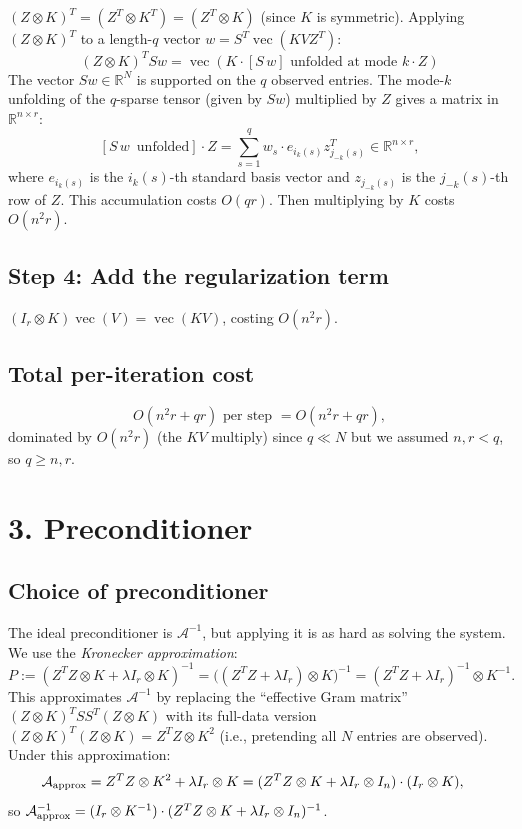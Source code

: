 \documentclass[12pt]{article}
\newcommand{\bR}{\mathbb{R}}
\DeclareMathOperator{\vecop}{vec}
\newcommand{\bR}{\mathbb{R}}
\begin{document}
$(Z\otimes K)^T = (Z^T\otimes K^T) = (Z^T\otimes K)$ (since $K$ is symmetric).  Applying $(Z\otimes K)^T$ to a length-$q$ vector $w = S^T\vecop(KVZ^T)$:
\[
  (Z\otimes K)^T S w = \vecop(K \cdot [S\,w]\text{ unfolded at mode }k \cdot Z)
\]
The vector $Sw \in\bR^N$ is supported on the $q$ observed entries.  The mode-$k$ unfolding of the $q$-sparse tensor (given by $Sw$) multiplied by $Z$ gives a matrix in $\bR^{n\times r}$:
\[
  [S\,w\,\text{ unfolded}] \cdot Z = \sum_{s=1}^q w_s \cdot e_{i_k(s)} z_{j_{-k}(s)}^T \in\bR^{n\times r},
\]
where $e_{i_k(s)}$ is the $i_k(s)$-th standard basis vector and $z_{j_{-k}(s)}$ is the $j_{-k}(s)$-th row of $Z$.  This accumulation costs $O(qr)$.  Then multiplying by $K$ costs $O(n^2 r)$.

\subsection*{Step 4: Add the regularization term}

$(I_r\otimes K)\vecop(V) = \vecop(KV)$, costing $O(n^2 r)$.

\subsection*{Total per-iteration cost}

\[
  O(n^2 r + qr) \text{ per step } = O(n^2 r + qr),
\]
dominated by $O(n^2 r)$ (the $KV$ multiply) since $q \ll N$ but we assumed $n,r < q$, so $q\geq n,r$.

\section*{3. Preconditioner}

\subsection*{Choice of preconditioner}

The ideal preconditioner is $\mathcal{A}^{-1}$, but applying it is as hard as solving the system.  We use the \emph{Kronecker approximation}:
\[
  P := (Z^T Z \otimes K + \lambda I_r\otimes K)^{-1}
     = \bigl((Z^TZ + \lambda I_r)\otimes K\bigr)^{-1}
     = (Z^TZ+\lambda I_r)^{-1}\otimes K^{-1}.
\]
This approximates $\mathcal{A}^{-1}$ by replacing the ``effective Gram matrix'' $(Z\otimes K)^T S S^T (Z\otimes K)$ with its full-data version $(Z\otimes K)^T(Z\otimes K) = Z^TZ\otimes K^2$ (i.e., pretending all $N$ entries are observed).  Under this approximation:
\begin{align*}
  \mathcal{A}_{\rm approx}
  &= Z^TZ\otimes K^2 + \lambda I_r\otimes K
   = (Z^TZ\otimes K + \lambda I_r\otimes I_n)\cdot(I_r\otimes K),
\end{align*}
so $\mathcal{A}_{\rm approx}^{-1} = (I_r\otimes K^{-1})\cdot(Z^TZ\otimes K + \lambda I_r\otimes I_n)^{-1}$.
\end{document}
